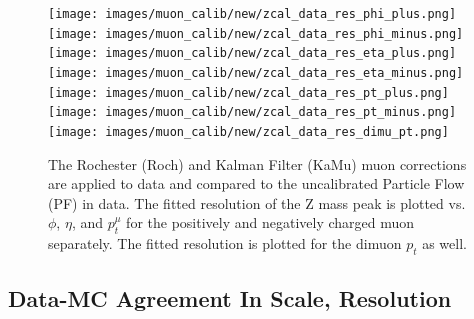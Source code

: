 \begin{figure}[!h]
  \centering
  \texttt{[image: images/muon\_calib/new/zcal\_data\_res\_phi\_plus.png]}
  \texttt{[image: images/muon\_calib/new/zcal\_data\_res\_phi\_minus.png]}
  \texttt{[image: images/muon\_calib/new/zcal\_data\_res\_eta\_plus.png]}
  \texttt{[image: images/muon\_calib/new/zcal\_data\_res\_eta\_minus.png]}
  \texttt{[image: images/muon\_calib/new/zcal\_data\_res\_pt\_plus.png]}
  \texttt{[image: images/muon\_calib/new/zcal\_data\_res\_pt\_minus.png]}
  \texttt{[image: images/muon\_calib/new/zcal\_data\_res\_dimu\_pt.png]}
  \caption[Rochester and Kalman filter muon corrections on the resolution of the Z mass peak in data.]
   {The Rochester (Roch) and Kalman Filter (KaMu) muon corrections are applied to data and compared to the uncalibrated Particle Flow (PF) in data. The fitted resolution of the Z mass peak is plotted  vs. $\phi$, $\eta$, and $p_t^\mu$ for the positively and negatively charged muon separately. The fitted resolution is plotted for the dimuon $p_t$ as well.}
  \label{fig:net_data_mu_calib_res}
\end{figure}

\FloatBarrier
\subsection{Data-MC Agreement In Scale, Resolution}

